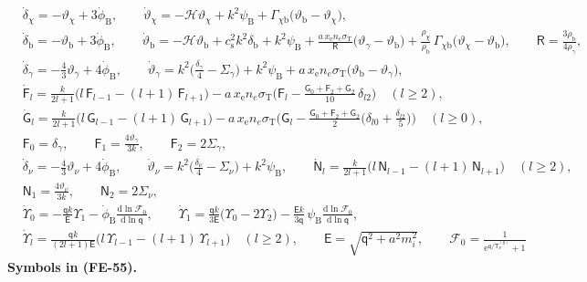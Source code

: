 \documentclass[
  10pt,
]{article}
\begin{document}
\[
\begin{aligned}
&\dot\delta_\chi = -\vartheta_\chi + 3\dot\phi_{\mathrm{B}},\qquad
 \dot\vartheta_\chi = -\mathcal{H}\vartheta_\chi + k^2\psi_{\mathrm{B}} + \Gamma_{\chi\mathrm{b}}\big(\vartheta_{\mathrm{b}} - \vartheta_\chi\big),\\
&\dot\delta_{\mathrm{b}} = -\vartheta_{\mathrm{b}} + 3\dot\phi_{\mathrm{B}},\qquad
 \dot\vartheta_{\mathrm{b}} = -\mathcal{H}\vartheta_{\mathrm{b}} + c_{\mathrm{s}}^2k^2\delta_{\mathrm{b}} + k^2\psi_{\mathrm{B}}
 + \frac{a\,x_{\mathrm{e}}n_e\sigma_{\mathrm{T}}}{\mathsf{R}}\big(\vartheta_\gamma - \vartheta_{\mathrm{b}}\big)
 + \frac{\rho_\chi}{\rho_{\mathrm{b}}}\,\Gamma_{\chi\mathrm{b}}\big(\vartheta_\chi - \vartheta_{\mathrm{b}}\big),\qquad
 \mathsf{R} = \frac{3\rho_{\mathrm{b}}}{4\rho_\gamma},\\
&\dot\delta_\gamma = -\frac43\vartheta_\gamma + 4\dot\phi_{\mathrm{B}},\qquad
 \dot\vartheta_\gamma = k^2\Big(\frac{\delta_\gamma}{4} - \Sigma_\gamma\Big) + k^2\psi_{\mathrm{B}} + a\,x_{\mathrm{e}}n_e\sigma_{\mathrm{T}}\big(\vartheta_{\mathrm{b}} - \vartheta_\gamma\big),\\
&\dot{\mathsf{F}}_l = \frac{k}{2l + 1}\big(l\,\mathsf{F}_{l-1} - (l + 1)\,\mathsf{F}_{l+1}\big)
 - a\,x_{\mathrm{e}}n_e\sigma_{\mathrm{T}}\Big(\mathsf{F}_l - \frac{\mathsf{G}_0 + \mathsf{F}_2 + \mathsf{G}_2}{10}\,\delta_{l2}\Big)\quad(l \ge 2),\\
&\dot{\mathsf{G}}_l = \frac{k}{2l + 1}\big(l\,\mathsf{G}_{l-1} - (l + 1)\,\mathsf{G}_{l+1}\big)
 - a\,x_{\mathrm{e}}n_e\sigma_{\mathrm{T}}\Big(\mathsf{G}_l - \frac{\mathsf{G}_0 + \mathsf{F}_2 + \mathsf{G}_2}{2}\Big(\delta_{l0} + \frac{\delta_{l2}}{5}\Big)\Big)\quad(l \ge 0),\\
&\mathsf{F}_0 = \delta_\gamma,\qquad \mathsf{F}_1 = \frac{4\vartheta_\gamma}{3k},\qquad \mathsf{F}_2 = 2\Sigma_\gamma,\\
&\dot\delta_\nu = -\frac43\vartheta_\nu + 4\dot\phi_{\mathrm{B}},\qquad \dot\vartheta_\nu = k^2\Big(\frac{\delta_\nu}{4} - \Sigma_\nu\Big) + k^2\psi_{\mathrm{B}},\qquad
 \dot{\mathsf{N}}_l = \frac{k}{2l + 1}\big(l\,\mathsf{N}_{l-1} - (l + 1)\,\mathsf{N}_{l+1}\big)\quad(l \ge 2),\\
&\mathsf{N}_1 = \frac{4\vartheta_\nu}{3k},\qquad \mathsf{N}_2 = 2\Sigma_\nu,\\
&\dot\Upsilon_0 = -\frac{\mathsf{q}k}{\mathsf{E}}\Upsilon_1 - \dot\phi_{\mathrm{B}}\frac{\mathrm{d}\ln\mathcal{F}_0}{\mathrm{d}\ln\mathsf{q}},\qquad
 \dot\Upsilon_1 = \frac{\mathsf{q}k}{3\mathsf{E}}\big(\Upsilon_0 - 2\Upsilon_2\big) - \frac{\mathsf{E}k}{3\mathsf{q}}\,\psi_{\mathrm{B}}\frac{\mathrm{d}\ln\mathcal{F}_0}{\mathrm{d}\ln\mathsf{q}},\\
&\dot\Upsilon_l = \frac{\mathsf{q}k}{(2l + 1)\mathsf{E}}\big(l\,\Upsilon_{l-1} - (l + 1)\,\Upsilon_{l+1}\big)\quad(l \ge 2),\qquad
 \mathsf{E} = \sqrt{\mathsf{q}^2 + a^2m_i^2},\qquad \mathcal{F}_0 = \frac{1}{\mathrm{e}^{\mathsf{q}/\mathsf{T}_\nu^{(0)}} + 1}
\end{aligned} \tag{FE-55}
\] \textbf{Symbols in (FE-55).}
\end{document}
